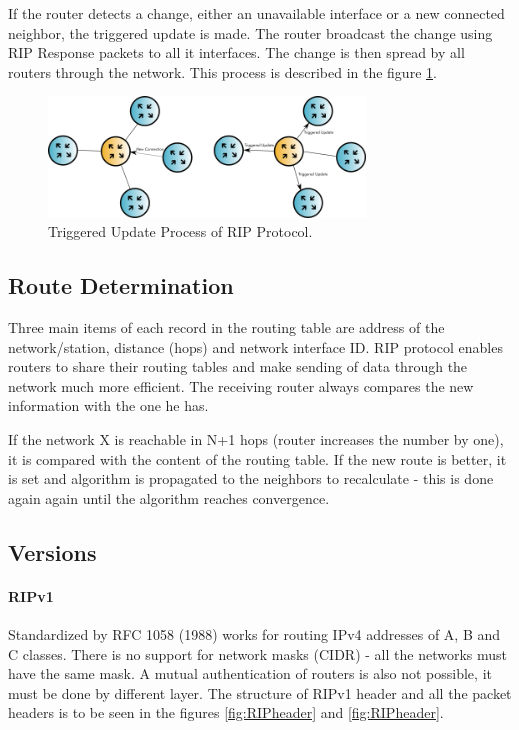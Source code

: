 \documentclass[10pt,a4paper,titlepage]{article}
\begin{document}
            If the router detects a change, either an unavailable interface or a new connected neighbor, the triggered update is made. The
            router broadcast the change using RIP Response packets to all it interfaces. The change is then spread by all routers through
            the network. This process is described in the figure \ref{fig:RIPtriggered}.

            \begin{figure}[h!]
                \begin{center}
                    \includegraphics[width=0.75\textwidth]{RIPtriggered.png}
                    \caption{Triggered Update Process of RIP Protocol. \label{fig:RIPtriggered}}
                \end{center}
            \end{figure}


        \subsection{Route Determination}
            Three main items of each record in the routing table are address of the network/station, distance (hops)
            and network interface ID. RIP protocol enables routers to share their routing tables and make sending of data through
            the network much more efficient. The receiving router always compares the new information with the one he has.

            If the network X is reachable in N+1 hops (router increases the number by one), it is compared with the content
            of the routing table. If the new route is better, it is set and algorithm is propagated to the neighbors to
            recalculate - this is done again again until the algorithm reaches convergence.


        \subsection{Versions}
            \paragraph{RIPv1}
                Standardized by RFC 1058 (1988) works for routing IPv4 addresses of A, B and C classes. There is no support for
                network masks (CIDR) - all the networks must have the same mask. A mutual authentication of routers is also not
                possible, it must be done by different layer. The structure of RIPv1 header and all the packet headers is to be
                seen in the figures \ref{fig:RIPheader} and \ref{fig:RIPheader}.\cite{RFC1058}
\end{document}
